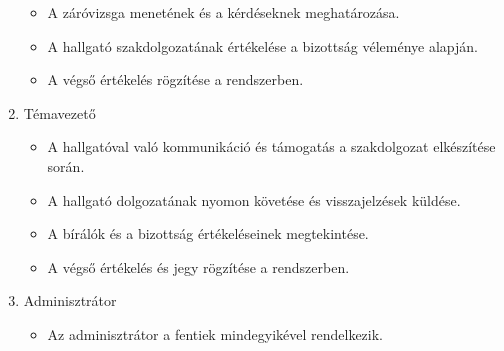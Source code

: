 \begin{enumerate}
\begin{itemize}
\item A záróvizsga menetének és a kérdéseknek meghatározása.

\item A hallgató szakdolgozatának értékelése a bizottság véleménye alapján.

\item A végső értékelés rögzítése a rendszerben.
\end{itemize}

\item Témavezető

\begin{itemize}
\item A hallgatóval való kommunikáció és támogatás a szakdolgozat elkészítése során.

\item A hallgató dolgozatának nyomon követése és visszajelzések küldése.

\item A bírálók és a bizottság értékeléseinek megtekintése.

\item A végső értékelés és jegy rögzítése a rendszerben.


\end{itemize}

\item Adminisztrátor

\begin{itemize}

\item Az adminisztrátor a fentiek mindegyikével rendelkezik.

\end{itemize}

\end{enumerate}

